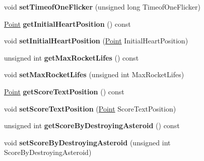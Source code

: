 \begin{DoxyCompactItemize}
\item 
void {\bfseries set\+Timeof\+One\+Flicker} (unsigned long Timeof\+One\+Flicker)\hypertarget{classGameConfiguration_a926e569d7576312e8b43de718f69b7aa}{}\label{classGameConfiguration_a926e569d7576312e8b43de718f69b7aa}

\item 
\hyperlink{classPoint}{Point} {\bfseries get\+Initial\+Heart\+Position} () const \hypertarget{classGameConfiguration_a1817c7f99ec4684a851175a7b9144089}{}\label{classGameConfiguration_a1817c7f99ec4684a851175a7b9144089}

\item 
void {\bfseries set\+Initial\+Heart\+Position} (\hyperlink{classPoint}{Point} Initial\+Heart\+Position)\hypertarget{classGameConfiguration_a5cb6f0eaba156234cd3bcf2d5bae9b2f}{}\label{classGameConfiguration_a5cb6f0eaba156234cd3bcf2d5bae9b2f}

\item 
unsigned int {\bfseries get\+Max\+Rocket\+Lifes} () const \hypertarget{classGameConfiguration_ac33d3c3d156490f1bafb710dcccecbef}{}\label{classGameConfiguration_ac33d3c3d156490f1bafb710dcccecbef}

\item 
void {\bfseries set\+Max\+Rocket\+Lifes} (unsigned int Max\+Rocket\+Lifes)\hypertarget{classGameConfiguration_a99e6730418254cdb11c4007e3749de05}{}\label{classGameConfiguration_a99e6730418254cdb11c4007e3749de05}

\item 
\hyperlink{classPoint}{Point} {\bfseries get\+Score\+Text\+Position} () const \hypertarget{classGameConfiguration_a7ad4eb7d0e789b295c244ce65939a9c7}{}\label{classGameConfiguration_a7ad4eb7d0e789b295c244ce65939a9c7}

\item 
void {\bfseries set\+Score\+Text\+Position} (\hyperlink{classPoint}{Point} Score\+Text\+Position)\hypertarget{classGameConfiguration_a6adc82174256c8c537bfde342148aeab}{}\label{classGameConfiguration_a6adc82174256c8c537bfde342148aeab}

\item 
unsigned int {\bfseries get\+Score\+By\+Destroying\+Asteroid} () const \hypertarget{classGameConfiguration_a02b275ca12b11c1a8608a0b14dccb0f6}{}\label{classGameConfiguration_a02b275ca12b11c1a8608a0b14dccb0f6}

\item 
void {\bfseries set\+Score\+By\+Destroying\+Asteroid} (unsigned int Score\+By\+Destroying\+Asteroid)\hypertarget{classGameConfiguration_a69e1aab9cce1cac74bc30a73f6264ba8}{}\label{classGameConfiguration_a69e1aab9cce1cac74bc30a73f6264ba8}


\end{DoxyCompactItemize}
